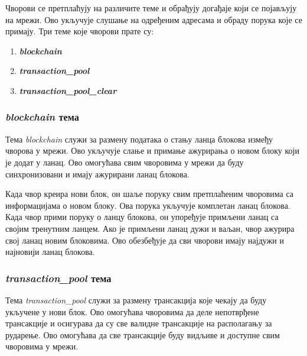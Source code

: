 \documentclass[12pt, a4paper]{article}
\begin{document}









Чворови се претплаћују на различите теме и обрађују догађаје који се појављују на мрежи. Ово укључује слушање на одређеним адресама и обраду порука које се примају. Три теме које чворови прате су:
\begin{enumerate}
    \item \textbf{\textit{blockchain}}
    \item \textbf{\textit{transaction\_pool}}
    \item \textbf{\textit{transaction\_pool\_clear}}
    
\end{enumerate}

\subsubsection{\textbf{\textit{blockchain}} тема}
Тема \textit{blockchain} служи за размену података о стању ланца блокова између чворова у мрежи. Ово укључује слање и примање ажурирања о новом блоку који је додат у ланац. Ово омогућава свим чворовима у мрежи да буду синхронизовани и имају ажурирани ланац блокова.

Када чвор креира нови блок, он шаље поруку свим претплаћеним чворовима са информацијама о новом блоку. Ова порука укључује комплетан ланац блокова. Када чвор прими поруку о ланцу блокова, он упоређује примљени ланац са својим тренутним ланцем. Ако је примљени ланац дужи и ваљан, чвор ажурира свој ланац новим блоковима. Ово обезбеђује да сви чворови имају најдужи и најновији ланац блокова.

\newpage
\subsubsection{\textbf{\textit{transaction\_pool}} тема}
Тема \textit{transaction\_pool} служи за размену трансакција које чекају да буду укључене у нови блок. Ово омогућава чворовима да деле непотврђене трансакције и осигурава да су све валидне трансакције на располагању за рударење. Ово омогућава да све трансакције буду видљиве и доступне свим чворовима у мрежи.
\end{document}
